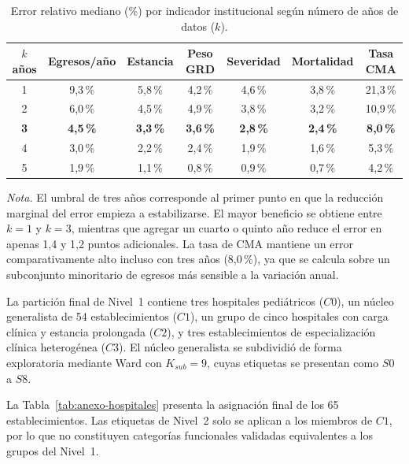 \begin{table}[htbp]
\centering
\caption{Error relativo mediano (\%) por indicador institucional según número de años de datos ($k$).}
\label{tab:simulacion-anios}
\begin{tabular}{c c c c c c c}
\toprule
\textbf{$k$ años} & \textbf{Egresos/año} & \textbf{Estancia} & \textbf{Peso GRD} & \textbf{Severidad} & \textbf{Mortalidad} & \textbf{Tasa CMA} \\
\midrule
1 & 9{,}3\,\% & 5{,}8\,\% & 4{,}2\,\% & 4{,}6\,\% & 3{,}8\,\% & 21{,}3\,\% \\
2 & 6{,}0\,\% & 4{,}5\,\% & 4{,}9\,\% & 3{,}8\,\% & 3{,}2\,\% & 10{,}9\,\% \\
\textbf{3} & \textbf{4{,}5\,\%} & \textbf{3{,}3\,\%} & \textbf{3{,}6\,\%} & \textbf{2{,}8\,\%} & \textbf{2{,}4\,\%} & \textbf{8{,}0\,\%} \\
4 & 3{,}0\,\% & 2{,}2\,\% & 2{,}4\,\% & 1{,}9\,\% & 1{,}6\,\% & 5{,}3\,\% \\
5 & 1{,}9\,\% & 1{,}1\,\% & 0{,}8\,\% & 0{,}9\,\% & 0{,}7\,\% & 4{,}2\,\% \\
\bottomrule
\end{tabular}
\par\smallskip
\begin{minipage}{\textwidth}
\normalsize\raggedright
\textit{Nota.} El umbral de tres años corresponde al primer punto en que la reducción marginal del error empieza a estabilizarse. El mayor beneficio se obtiene entre $k=1$ y $k=3$, mientras que agregar un cuarto o quinto año reduce el error en apenas 1{,}4 y 1{,}2 puntos adicionales. La tasa de CMA mantiene un error comparativamente alto incluso con tres años (8{,}0\,\%), ya que se calcula sobre un subconjunto minoritario de egresos más sensible a la variación anual.
\end{minipage}
\end{table}

La partición final de Nivel~1 contiene tres hospitales pediátricos ($C0$), un
núcleo generalista de 54 establecimientos ($C1$), un grupo de cinco hospitales
con carga clínica y estancia prolongada ($C2$), y tres establecimientos de
especialización clínica heterogénea ($C3$). El núcleo generalista se subdividió
de forma exploratoria mediante Ward con $K_{sub}=9$, cuyas etiquetas se
presentan como $S0$ a $S8$.

La Tabla~\ref{tab:anexo-hospitales} presenta la asignación final de los 65
establecimientos. Las etiquetas de Nivel~2 solo se aplican a los miembros de
$C1$, por lo que no constituyen categorías funcionales validadas equivalentes a los grupos
del Nivel~1.

